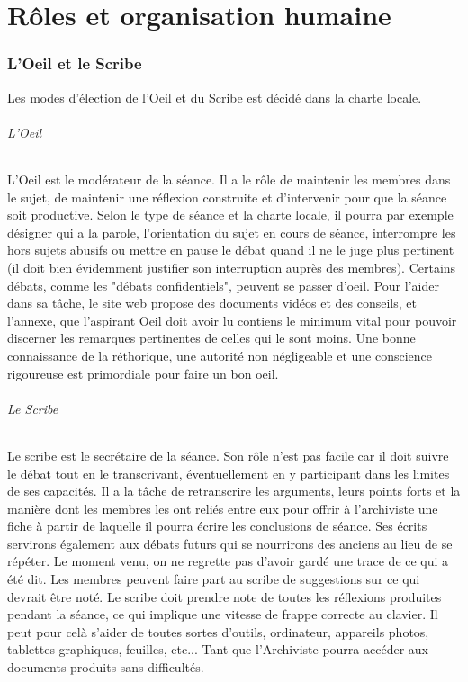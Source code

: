 \documentclass[a4paper,11pt]{article}
\begin{document}
\newpage
\part{Rôles et organisation humaine}
\section{L'Oeil et le Scribe}
Les modes d'élection de l'Oeil et du Scribe est décidé dans la charte locale.
\paragraph{L'Oeil}
L'Oeil est le modérateur de la séance. Il a le rôle de maintenir les membres dans le sujet, de maintenir une réflexion construite et d'intervenir pour que la séance soit productive. Selon le type de séance et la charte locale, il pourra par exemple désigner qui a la parole, l'orientation du sujet en cours de séance, interrompre les hors sujets abusifs ou mettre en pause le débat quand il ne le juge plus pertinent (il doit bien évidemment justifier son interruption auprès des membres). Certains débats, comme les "débats confidentiels", peuvent se passer d'oeil. Pour l'aider dans sa tâche, le site web propose des documents vidéos et des conseils, et l'annexe, que l'aspirant Oeil doit avoir lu contiens le minimum vital pour pouvoir discerner les remarques pertinentes de celles qui le sont moins. Une bonne connaissance de la réthorique, une autorité non négligeable et une conscience rigoureuse est primordiale pour faire un bon oeil. 

\paragraph{Le Scribe}
Le scribe est le secrétaire de la séance. Son rôle n'est pas facile car il doit suivre le débat tout en le transcrivant, éventuellement en y participant dans les limites de ses capacités. Il a la tâche de retranscrire les arguments, leurs points forts et la manière dont les membres les ont reliés entre eux pour offrir à l'archiviste une fiche à partir de laquelle il pourra écrire les conclusions de séance. Ses écrits servirons également aux débats futurs qui se nourrirons des anciens au lieu de se répéter. Le moment venu, on ne regrette pas d'avoir gardé une trace de ce qui a été dit. Les membres peuvent faire part au scribe de suggestions sur ce qui devrait être noté. Le scribe doit prendre note de toutes les réflexions produites pendant la séance, ce qui implique une vitesse de frappe correcte au clavier. Il peut pour celà s'aider de toutes sortes d'outils, ordinateur, appareils photos, tablettes graphiques, feuilles, etc... Tant que l'Archiviste pourra accéder aux documents produits sans difficultés.
\end{document}
